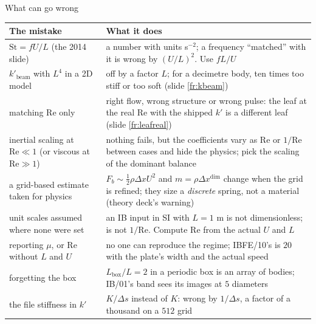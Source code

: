 \documentclass[aspectratio=169,11pt]{beamer}
\begin{document}
\begin{frame}{What can go wrong}
\label{fr:wrong}
\scriptsize
\begin{tabular}{@{}L{0.32\textwidth}L{0.6\textwidth}@{}}
\toprule
The mistake & What it does\\
\midrule
$\mathrm{St} = fU/L$ (the 2014 slide) & a number with units s$^{-2}$; a frequency ``matched'' with it is wrong by $(U/L)^2$. Use $fL/U$\\
$k'_{\mathrm{beam}}$ with $L^4$ in a 2D model & off by a factor $L$; for a decimetre body, ten times too stiff or too soft (slide \ref{fr:kbeam})\\
matching $\mathrm{Re}$ only & right flow, wrong structure or wrong pulse: the leaf at the real $\mathrm{Re}$ with the shipped $k'$ is a different leaf (slide \ref{fr:leafreal})\\
inertial scaling at $\mathrm{Re} \ll 1$ (or viscous at $\mathrm{Re} \gg 1$) & nothing fails, but the coefficients vary as $\mathrm{Re}$ or $1/\mathrm{Re}$ between cases and hide the physics; pick the scaling of the dominant balance\\
a grid-based estimate taken for physics & $F_b \sim \frac12\rho\Delta x U^2$ and $m = \rho\Delta x^{\mathrm{dim}}$ change when the grid is refined; they size a \emph{discrete} spring, not a material (theory deck's warning)\\
unit scales assumed where none were set & an IB input in SI with $L = 1$ m is not dimensionless;  is not $1/\mathrm{Re}$. Compute $\mathrm{Re}$ from the actual $U$ and $L$\\
reporting $\mu$, or $\mathrm{Re}$ without $L$ and $U$ & no one can reproduce the regime; IBFE/10's  is $20$ with the plate's width and the actual speed\\
forgetting the box & $L_{\mathrm{box}}/L = 2$ in a periodic box is an array of bodies; IB/01's band sees its images at $5$ diameters\\
the file stiffness in $k'$ & $K/\Delta s$ instead of $K$: wrong by $1/\Delta s$, a factor of a thousand on a $512$ grid\\
\bottomrule
\end{tabular}
\end{frame}
\end{document}
